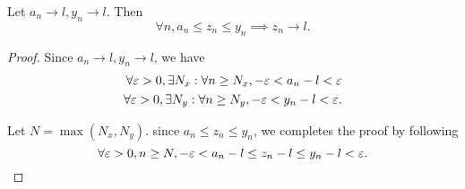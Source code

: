 





\begin{theorem}
  \label{thm:limit_squeeze}
  Let $a_n \to l, y_n \to l$. Then
  \begin{equation}
    \forall n, a_n \le z_n \le y_n \implies z_n \to l.
  \end{equation}
\end{theorem}

\begin{proof}
  Since $a_n \to l, y_n \to l$, we have
  \begin{equation}
    \begin{split}
      \forall \varepsilon > 0, \exists N_x: \forall n \ge N_x, -\varepsilon < a_n - l < \varepsilon \\
      \forall \varepsilon > 0, \exists N_y: \forall n \ge N_y, -\varepsilon < y_n - l < \varepsilon.
    \end{split}
  \end{equation}

  Let $N = \max(N_x, N_y)$. since $a_n \le z_n \le y_n$, we completes the proof
  by following
  \begin{equation}
    \forall \varepsilon > 0, n \ge N, -\varepsilon < a_n - l \le z_n - l \le y_n - l < \varepsilon.
  \end{equation}
\end{proof}



